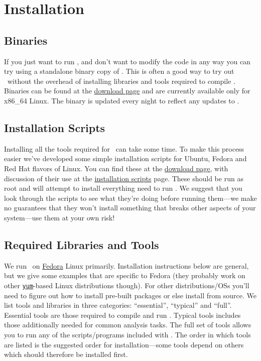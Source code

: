 \chapter{Installation}

\section{Binaries}

If you just want to run \glc, and don't want to modify the code in any way you can try using a standalone binary copy of \glc. This is often a good way to try out \glc\ without the overhead of installing libraries and tools required to compile \glc. Binaries can be found at the \href{https://sites.google.com/site/galacticusmodel/downloads}{download page} and are currently available only for x86\_64 Linux. The binary is updated every night to reflect any updates to \glc.

\section{Installation Scripts}

Installing all the tools required for \glc\ can take some time. To make this process easier we've developed some simple installation scripts for Ubuntu, Fedora and Red Hat flavors of Linux. You can find these at the \href{https://sites.google.com/site/galacticusmodel/downloads}{download page}, with discussion of their use at the \href{https://sites.google.com/site/galacticusmodel/downloads/installtion-scripts}{installation scripts} page. These should be run as root and will attempt to install everything need to run \glc. We suggest that you look through the scripts to see what they're doing before running them---we make no guarantees that they won't install something that breaks other aspects of your system---use them at your own risk!

\section{Required Libraries and Tools}

We run \glc\ on \href{http://fedoraproject.org/}{Fedora} Linux primarily. Installation instructions below are general, but we give some examples that are specific to Fedora (they probably work on other \href{http://yum.baseurl.org/}{{\tt yum}}-based Linux distributions though). For other distributions/OSs you'll need to figure out how to install pre-built packages or else install from source. We list tools and libraries in three categories: ``essential'', ``typical'' and ``full''. Essential tools are those required to compile and run \glc. Typical tools includes those additionally needed for common analysis tasks. The full set of tools allows you to run any of the scripts/programs included with \glc. The order in which tools are listed is the suggested order for installation---some tools depend on others which should therefore be installed first.

